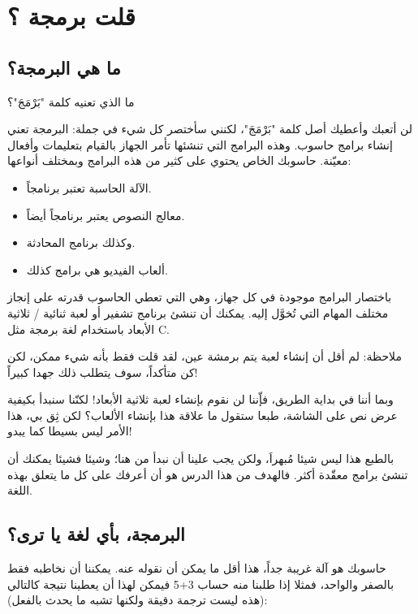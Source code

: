 \chapter{قلت برمجة ؟}
\section{ما هي البرمجة؟}
\begin{question}
  ما الذي تعنيه كلمة "بَرْمَجَ"؟
\end{question}

لن أتعبك وأعطيك أصل كلمة "بَرْمَجَ"، لكنني سأختصر كل شيء في جملة: البرمجة تعني إنشاء برامج حاسوب. وهذه البرامج التي تنشئها تأمر الجهاز بالقيام بتعليمات وأفعال معيّنة.
حاسوبك الخاص يحتوي على كثير من هذه البرامج وبمختلف أنواعها:

\begin{itemize}
  \item الآلة الحاسبة تعتبر برنامجاً.
  \item معالج النصوص يعتبر برنامجاً أيضاً.
  \item وكذلك برنامج المحادثة.
  \item ألعاب الفيديو هي برامج كذلك.
\end{itemize}

باختصار البرامج موجودة في كل جهاز، وهي التي تعطي الحاسوب قدرته على إنجاز مختلف المهام التي تُخوَّل إليه. يمكنك أن تنشئ برنامج تشفير أو لعبة ثنائية / ثلاثية الأبعاد باستخدام لغة برمجة مثل \textenglish{C}.

ملاحظة: لم أقل أن إنشاء لعبة يتم برمشة عين، لقد قلت فقط بأنه شيء ممكن، لكن كن متأكداً، سوف يتطلب ذلك جهدا كبيراً!

وبما أننا في بداية الطريق، فإّننا لن نقوم بإنشاء لعبة ثلاثية الأبعاد! لكنّنا سنبدأ بكيفية عرض نص على الشاشة، طبعا ستقول ما علاقة هذا بإنشاء الألعاب؟ لكن ثِق بي، هذا الأمر ليس بسيطا كما يبدو!

بالطبع هذا ليس شيئا مُبهراَ، ولكن يجب علينا أن نبدأ من هنا؛ وشيئا فشيئا يمكنك أن تنشئ برامج معقّدة أكثر. فالهدف من هذا الدرس هو أن أعرفك على كل ما يتعلق بهذه اللغة.

\section{البرمجة، بأي لغة يا ترى؟}
حاسوبك هو آلة غريبة جداً، هذا أقل ما يمكن أن نقوله عنه. يمكننا أن نخاطبه فقط بالصفر والواحد، فمثلا إذا طلبنا منه حساب 3+5 فيمكن لهذا أن يعطينا نتيجة كالتالي (هذه ليست ترجمة دقيقة ولكنها تشبه ما يحدث بالفعل):

